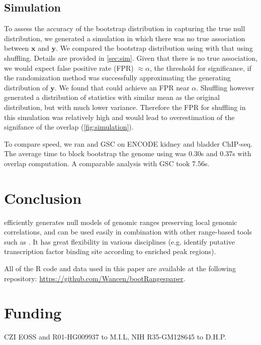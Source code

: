\subsection{Simulation}

To assess the accuracy of the bootstrap distribution in capturing
the true null distribution, we generated a simulation in which
there was no true association between $\bm{x}$ and $\bm{y}$. 
We compared the bootstrap distribution using \bootranges 
with that using shuffling. Details are provided in \cref{sec:sim}. 
Given that there is no true association, we would expect false
positive rate (FPR) $\approx \alpha$, 
the threshold for significance, if the randomization method was 
successfully approximating the generating distribution of $\bm{y}$.
We found that \bootranges could achieve an FPR near $\alpha$. 
Shuffling however generated a distribution of statistics
with similar mean as the original distribution, but with much lower
variance.
Therefore the FPR for shuffling in this simulation was relatively high 
and would lead to overestimation of the signifance of the overlap 
(\cref{fig:simulation}).

To compare speed, we ran \bootranges and GSC on
ENCODE kidney and bladder ChIP-seq. The average time to
block bootstrap the genome using \bootranges was 0.30s and
0.37s with overlap computation. A comparable analysis with GSC took
7.56s.

\section{Conclusion}

\bootranges efficiently generates null models of genomic ranges preserving 
local genomic correlations, and can be used easily in combination with
other range-based tools such as \plyranges.
It has great flexibility in various disciplines (e.g. identify
putative transcription factor binding site according to enriched peak
regions).

All of the R code and data used in this paper are available at the
following repository: 
\url{https://github.com/Wancen/bootRangespaper}.


\section*{Funding}
CZI EOSS and R01-HG009937 to M.I.L, NIH R35-GM128645 to D.H.P.

